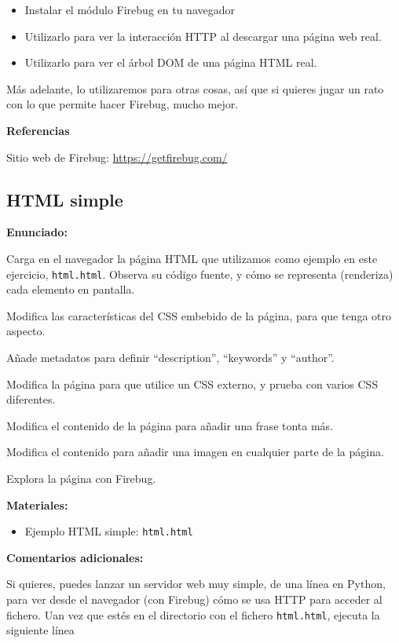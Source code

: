 \begin{itemize}
\item Instalar el módulo Firebug en tu navegador
\item Utilizarlo para ver la interacción HTTP al descargar una página web real.
\item Utilizarlo para ver el árbol DOM de una página HTML real.
\end{itemize}

Más adelante, lo utilizaremos para otras cosas, así que si quieres jugar un rato con lo que permite hacer Firebug, mucho mejor.

\textbf{Referencias}

Sitio web de Firebug: \url{https://getfirebug.com/}


\subsection{HTML simple}
\label{subsec:eje-html-simple}

\textbf{Enunciado:}

Carga en el navegador la página HTML que utilizamos como ejemplo en este ejercicio, \verb|html.html|. Observa su código fuente, y cómo se representa (renderiza) cada elemento en pantalla.

Modifica las características del CSS embebido de la página, para que tenga otro aspecto.

Añade metadatos para definir ``description'', ``keywords'' y ``author''.

Modifica la página para que utilice un CSS externo, y prueba con varios CSS diferentes.

Modifica el contenido de la página para añadir una frase tonta más.

Modifica el contenido para añadir una imagen en cualquier parte de la página.

Explora la página con Firebug.

\textbf{Materiales:}

\begin{itemize}
\item Ejemplo HTML simple: \verb|html.html|
\end{itemize}

\textbf{Comentarios adicionales:}

Si quieres, puedes lanzar un servidor web muy simple, de una línea en Python, para ver desde el navegador (con Firebug) cómo se usa HTTP para acceder al fichero. Uan vez que estés en el directorio con el fichero \verb|html.html|, ejecuta la siguiente línea

